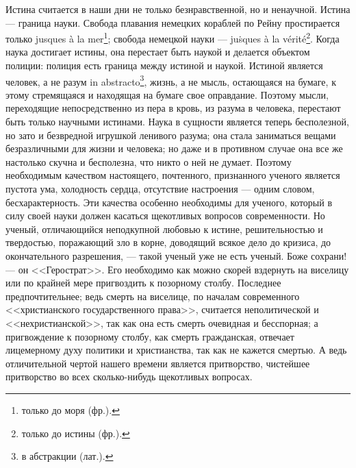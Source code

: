 \documentclass[12pt,oneside]{book}
\begin{document}
Истина считается в наши дни не только безнравственной, но и ненаучной. Истина --- граница науки. Свобода плавания немецких кораблей по Рейну простирается только jusques \`a la mer\footnote{только до моря (фр.).}; свобода немецкой науки --- ju\. sques \` a la v\' erit\' e\footnote{только до истины (фр.).}. Когда наука достигает истины, она перестает быть наукой и делается объектом полиции: полиция есть граница между истиной и наукой. Истиной является человек, а не разум in abstracto\footnote{в абстракции (лат.).}, жизнь, а не мысль, остающаяся на бумаге, к этому стремящаяся и находящая на бумаге свое оправдание. Поэтому мысли, переходящие непосредственно из пера в кровь, из разума в человека, перестают быть только научными истинами. Наука в сущности является теперь бесполезной, но зато и безвредной игрушкой ленивого разума; она стала заниматься вещами безразличными для жизни и человека; но даже и в противном случае она все же настолько скучна и бесполезна, что никто о ней не думает. Поэтому необходимым качеством настоящего, почтенного, признанного ученого является пустота ума, холодность сердца, отсутствие настроения --- одним словом, бесхарактерность. Эти качества особенно необходимы для ученого, который в силу своей науки должен касаться щекотливых вопросов современности. Но ученый, отличающийся неподкупной любовью к истине, решительностью и твердостью, поражающий зло в корне, доводящий всякое дело до кризиса, до окончательного разрешения, --- такой ученый уже не есть ученый. Боже сохрани! --- он <<Герострат>>. Его необходимо как можно скорей вздернуть на виселицу или по крайней мере пригвоздить к позорному столбу. Последнее предпочтительнее; ведь смерть на виселице, по началам современного <<христианского государственного права>>, считается неполитической и <<нехристианской>>, так как она есть смерть очевидная и бесспорная; а пригвождение к позорному столбу, как смерть гражданская, отвечает лицемерному духу политики и христианства, так как не кажется смертью. А ведь отличительной чертой нашего времени является притворство, чистейшее притворство во всех сколько-нибудь щекотливых вопросах.
\end{document}
